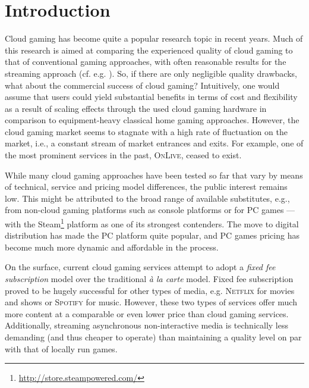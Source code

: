 

\section{Introduction}

Cloud gaming has become quite a popular research topic in recent years. Much of this research is aimed at comparing the experienced quality of cloud gaming to that of conventional gaming approaches, with often reasonable results for the streaming approach (cf. e.g. \cite{5976180}). So, if there are only negligible quality drawbacks, what about the commercial success of cloud gaming? Intuitively, one would assume that users could yield substantial benefits in terms of cost and flexibility as a result of scaling effects through the used cloud gaming hardware in comparison to equipment-heavy classical home gaming approaches. However, the cloud gaming market seems to stagnate with a high rate of fluctuation on the market, i.e., a constant stream of market entrances and exits. For example, one of the most prominent services in the past, \textsc{OnLive}, ceased to exist.




While many cloud gaming approaches have been tested so far that vary by means of technical, service and pricing model differences, the public interest remains low. This might be attributed to the broad range of available substitutes, e.g., from non-cloud gaming platforms such as console platforms or for PC games --- with the Steam\footnote{\url{http://store.steampowered.com/}} platform as one of its strongest contenders. The move to digital distribution has made the PC platform quite popular, and PC games pricing has become much more dynamic and affordable in the process.

On the surface, current cloud gaming services attempt to adopt a \textit{fixed fee subscription} model over the traditional \textit{à la carte} model. Fixed fee subscription proved to be hugely successful for other types of media, e.g. \textsc{Netflix} for movies and shows or \textsc{Spotify} for music. However, these two types of services offer much more content at a comparable or even lower price than cloud gaming services. Additionally, streaming asynchronous non-interactive media is technically less demanding (and thus cheaper to operate) than maintaining a quality level on par with that of locally run games.

